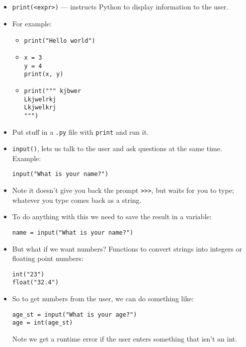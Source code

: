 \documentclass{article}
\begin{document}
\begin{itemize}
\item \verb|print(<expr>)| --- instructs Python to display information
  to the user.
\item For example:
  \begin{itemize}
  \item \verb|print("Hello world")|
  \item
\begin{verbatim}
x = 3
y = 4
print(x, y)
\end{verbatim}
  \item
\begin{verbatim}
print(""" kjbwer
Lkjwelrkj
Lkjwelkrj
""")
\end{verbatim}
  \end{itemize}

\item Put stuff in a \verb|.py| file with \verb|print| and run it.

\item \verb|input()|, lets us talk to the user and ask questions
  at the same time.  Example:
\begin{verbatim}
input("What is your name?")
\end{verbatim}
\item Note it doesn't give you back the prompt \verb|>>>|, but waits
  for you to type; whatever you type comes back as a string.

\item  To do anything with this we need to save the result in a variable:
\begin{verbatim}
name = input("What is your name?")
\end{verbatim}

\item  But what if we want numbers? Functions to convert strings into
  integers or floating point numbers:
\begin{verbatim}
int("23")
float("32.4")
\end{verbatim}

\item So to get numbers from the user, we can do something like:
\begin{verbatim}
age_st = input("What is your age?")
age = int(age_st)
\end{verbatim}

  Note we get a runtime error if the user enters something that isn't
  an int.
\end{itemize}
\end{document}
